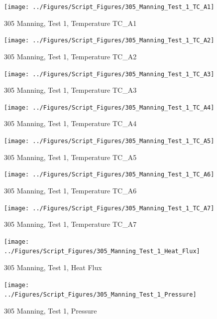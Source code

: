 \documentclass[12pt,oneside]{book}
\begin{document}
\begin{figure}[!ht]
\texttt{[image: ../Figures/Script\_Figures/305\_Manning\_Test\_1\_TC\_A1]}
\caption{305 Manning, Test 1, Temperature TC\_A1}
\label{fig:305_Manning_Test_1_TC_A1}
\end{figure}

\begin{figure}[!ht]
\texttt{[image: ../Figures/Script\_Figures/305\_Manning\_Test\_1\_TC\_A2]}
\caption{305 Manning, Test 1, Temperature TC\_A2}
\label{fig:305_Manning_Test_1_TC_A2}
\end{figure}

\begin{figure}[!ht]
\texttt{[image: ../Figures/Script\_Figures/305\_Manning\_Test\_1\_TC\_A3]}
\caption{305 Manning, Test 1, Temperature TC\_A3}
\label{fig:305_Manning_Test_1_TC_A3}
\end{figure}

\begin{figure}[!ht]
\texttt{[image: ../Figures/Script\_Figures/305\_Manning\_Test\_1\_TC\_A4]}
\caption{305 Manning, Test 1, Temperature TC\_A4}
\label{fig:305_Manning_Test_1_TC_A4}
\end{figure}

\begin{figure}[!ht]
\texttt{[image: ../Figures/Script\_Figures/305\_Manning\_Test\_1\_TC\_A5]}
\caption{305 Manning, Test 1, Temperature TC\_A5}
\label{fig:305_Manning_Test_1_TC_A5}
\end{figure}

\begin{figure}[!ht]
\texttt{[image: ../Figures/Script\_Figures/305\_Manning\_Test\_1\_TC\_A6]}
\caption{305 Manning, Test 1, Temperature TC\_A6}
\label{fig:305_Manning_Test_1_TC_A6}
\end{figure}

\begin{figure}[!ht]
\texttt{[image: ../Figures/Script\_Figures/305\_Manning\_Test\_1\_TC\_A7]}
\caption{305 Manning, Test 1, Temperature TC\_A7}
\label{fig:305_Manning_Test_1_TC_A7}
\end{figure}

\begin{figure}[!ht]
\texttt{[image: ../Figures/Script\_Figures/305\_Manning\_Test\_1\_Heat\_Flux]}
\caption{305 Manning, Test 1, Heat Flux}
\label{fig:305_Manning_Test_1_Heat_Flux}
\end{figure}

\begin{figure}[!ht]
\texttt{[image: ../Figures/Script\_Figures/305\_Manning\_Test\_1\_Pressure]}
\caption{305 Manning, Test 1, Pressure}
\label{fig:305_Manning_Test_1_Pressure}
\end{figure}
\end{document}
